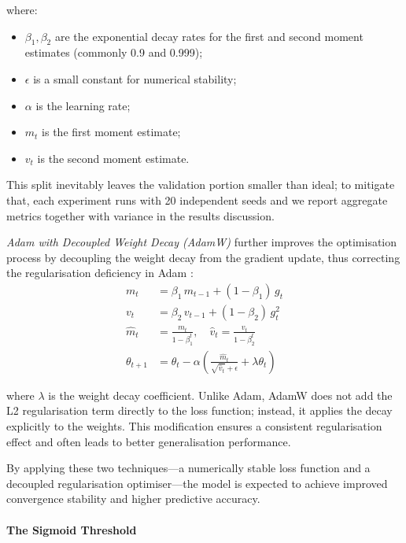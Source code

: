 \documentclass[12pt]{article}
\begin{document}
where:
\begin{itemize}
    \item $\beta_1, \beta_2$ are the exponential decay rates for the first and second moment estimates (commonly 0.9 and 0.999);
    \item $\epsilon$ is a small constant for numerical stability;
    \item $\alpha$ is the learning rate;
    \item $m_t$ is the first moment estimate;
    \item $v_t$ is the second moment estimate.
\end{itemize}

This split inevitably leaves the validation portion smaller than ideal; to mitigate that, each experiment runs with 20 independent seeds and we report aggregate metrics together with variance in the results discussion.

\textit{Adam with Decoupled Weight Decay (AdamW)} further improves the optimisation process by decoupling the weight decay from the gradient update, thus correcting the regularisation deficiency in Adam \cite{loshchilov2019adamw}:
\begin{equation}
\begin{aligned}
m_t &= \beta_1 \, m_{t-1} + (1 - \beta_1) \, g_t \\
v_t &= \beta_2 \, v_{t-1} + (1 - \beta_2) \, g_t^2 \\
\hat{m}_t &= \frac{m_t}{1 - \beta_1^t}, \quad
\hat{v}_t = \frac{v_t}{1 - \beta_2^t} \\
\theta_{t+1} &= \theta_t - \alpha \left( \frac{\hat{m}_t}{\sqrt{\hat{v}_t} + \epsilon} + \lambda \theta_t \right)
\end{aligned}
\end{equation}

where $\lambda$ is the weight decay coefficient.  
Unlike Adam, AdamW does not add the L2 regularisation term directly to the loss function; instead, it applies the decay explicitly to the weights. This modification ensures a consistent regularisation effect and often leads to better generalisation performance.

By applying these two techniques\;---\;a numerically stable loss function and a decoupled regularisation optimiser\;---\;the model is expected to achieve improved convergence stability and higher predictive accuracy.

\paragraph{The Sigmoid Threshold}
\end{document}
